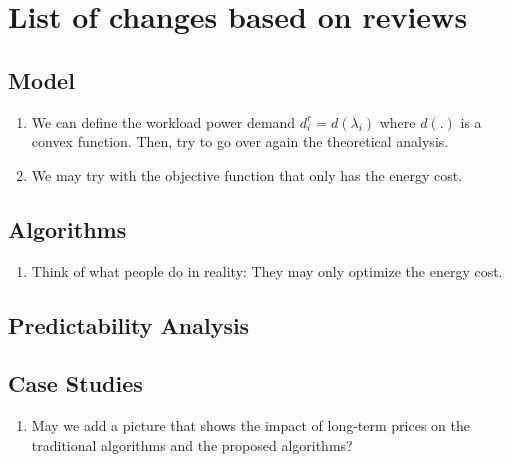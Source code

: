 \section{List of changes based on reviews}

\subsection{Model}
\label{change.model}

\begin{enumerate}
	\item We can define the workload power demand $d^r_i = d(\lambda_i)$ where $d(.)$ is a convex function. Then, try to go over again the theoretical analysis.
	\item We may try with the objective function that only has the energy cost.
\end{enumerate}

\subsection{Algorithms}

\begin{enumerate}
	\item Think of what people do in reality: They may only optimize the energy cost.
\end{enumerate}

\subsection{Predictability Analysis}

\subsection{Case Studies}

\begin{enumerate}
	\item May we add a picture that shows the impact of long-term prices on the traditional algorithms and the proposed algorithms?
\end{enumerate}